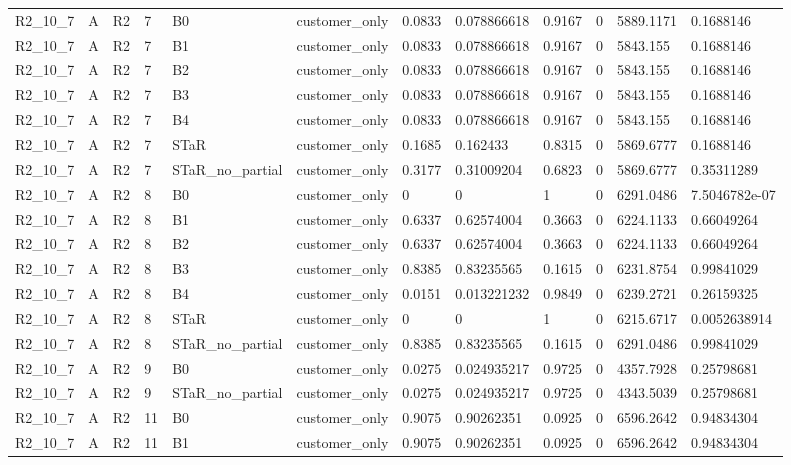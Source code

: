 \begin{longtable}{llllllllllll}
R2\_10\_7 & A & R2 & 7 & B0 & customer\_only & 0.0833 & 0.078866618 & 0.9167 & 0 & 5889.1171 & 0.1688146 \\
R2\_10\_7 & A & R2 & 7 & B1 & customer\_only & 0.0833 & 0.078866618 & 0.9167 & 0 & 5843.155 & 0.1688146 \\
R2\_10\_7 & A & R2 & 7 & B2 & customer\_only & 0.0833 & 0.078866618 & 0.9167 & 0 & 5843.155 & 0.1688146 \\
R2\_10\_7 & A & R2 & 7 & B3 & customer\_only & 0.0833 & 0.078866618 & 0.9167 & 0 & 5843.155 & 0.1688146 \\
R2\_10\_7 & A & R2 & 7 & B4 & customer\_only & 0.0833 & 0.078866618 & 0.9167 & 0 & 5843.155 & 0.1688146 \\
R2\_10\_7 & A & R2 & 7 & STaR & customer\_only & 0.1685 & 0.162433 & 0.8315 & 0 & 5869.6777 & 0.1688146 \\
R2\_10\_7 & A & R2 & 7 & STaR\_no\_partial & customer\_only & 0.3177 & 0.31009204 & 0.6823 & 0 & 5869.6777 & 0.35311289 \\
R2\_10\_7 & A & R2 & 8 & B0 & customer\_only & 0 & 0 & 1 & 0 & 6291.0486 & 7.5046782e-07 \\
R2\_10\_7 & A & R2 & 8 & B1 & customer\_only & 0.6337 & 0.62574004 & 0.3663 & 0 & 6224.1133 & 0.66049264 \\
R2\_10\_7 & A & R2 & 8 & B2 & customer\_only & 0.6337 & 0.62574004 & 0.3663 & 0 & 6224.1133 & 0.66049264 \\
R2\_10\_7 & A & R2 & 8 & B3 & customer\_only & 0.8385 & 0.83235565 & 0.1615 & 0 & 6231.8754 & 0.99841029 \\
R2\_10\_7 & A & R2 & 8 & B4 & customer\_only & 0.0151 & 0.013221232 & 0.9849 & 0 & 6239.2721 & 0.26159325 \\
R2\_10\_7 & A & R2 & 8 & STaR & customer\_only & 0 & 0 & 1 & 0 & 6215.6717 & 0.0052638914 \\
R2\_10\_7 & A & R2 & 8 & STaR\_no\_partial & customer\_only & 0.8385 & 0.83235565 & 0.1615 & 0 & 6291.0486 & 0.99841029 \\
R2\_10\_7 & A & R2 & 9 & B0 & customer\_only & 0.0275 & 0.024935217 & 0.9725 & 0 & 4357.7928 & 0.25798681 \\
R2\_10\_7 & A & R2 & 9 & STaR\_no\_partial & customer\_only & 0.0275 & 0.024935217 & 0.9725 & 0 & 4343.5039 & 0.25798681 \\
R2\_10\_7 & A & R2 & 11 & B0 & customer\_only & 0.9075 & 0.90262351 & 0.0925 & 0 & 6596.2642 & 0.94834304 \\
R2\_10\_7 & A & R2 & 11 & B1 & customer\_only & 0.9075 & 0.90262351 & 0.0925 & 0 & 6596.2642 & 0.94834304 \\

\end{longtable}
